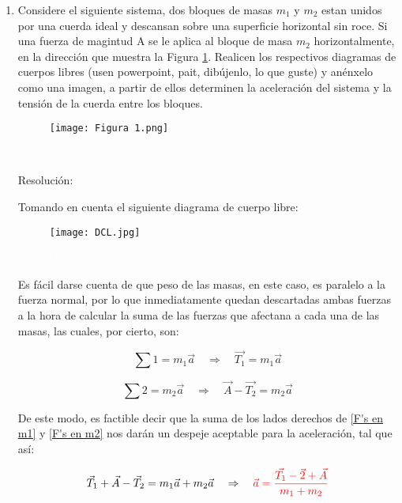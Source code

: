 \documentclass[12pt,letterpaper]{article}
\begin{document}
\begin{enumerate}
    \item Considere el siguiente sistema, dos bloques de masas $m_{1}$ y $m_{2}$ estan unidos por una cuerda ideal y descansan sobre una superficie horizontal sin roce. Si una fuerza de magintud A se le aplica al bloque de masa $m_{2}$ horizontalmente, en la dirección que muestra la Figura \ref{fig 1}. Realicen los respectivos diagramas de cuerpos libres (usen powerpoint, pait, dibújenlo, lo que guste) y anénxelo como una imagen, a partir de ellos determinen la aceleración del sistema y la tensión de la cuerda entre los bloques.

        \begin{figure}[h]
            \centering
            \texttt{[image: Figura 1.png]}
            \caption{\textcolor{white}{Sistema de dos bloques amarrados}}
            \label{fig 1}
        \end{figure}
    
    Resolución:\newline

    Tomando en cuenta el siguiente diagrama de cuerpo libre:

        \begin{figure}[h]
            \centering
            \texttt{[image: DCL.jpg]}
            \caption{\textcolor{white}{Diagrama cuerpo libre de dos bloques amarrados}}
            \label{Diagrama 1}
        \end{figure}

    Es fácil darse cuenta de que peso de las masas, en este caso, es paralelo a la fuerza normal, por lo que inmediatamente quedan descartadas ambas fuerzas a la hora de calcular la suma de las fuerzas que afectana a cada una de las masas, las cuales, por cierto, son:

        \begin{equation}
            \label{F's en m1}
            \sum 1=m_{1}\vec{a}\quad \Rightarrow \quad \vec{T_{1}}=m_{1}\vec{a}
        \end{equation}

        \begin{equation}
            \label{F's en m2}
            \sum 2=m_{2}\vec{a}\quad \Rightarrow \quad \vec{A}-\vec{T_{2}}=m_{2}\vec{a}
        \end{equation}

    De este modo, es factible decir que la suma de los lados derechos de \ref{F's en m1} y \ref{F's en m2} nos darán un despeje aceptable para la aceleración, tal que así:

        \begin{equation}
            \label{aceleración en sistema de cuerdas}
            \vec{T}_{1}+\vec{A}-\vec{T}_{2}=m_{1}\vec{a}+m_{2}\vec{a}\quad
            \Rightarrow \quad
            \textcolor{red}{\vec{a}=\frac{\vec{T_{1}}-\vec{2}+\vec{A}}{m_{1}+m_{2}}}
        \end{equation}
    

\end{enumerate}
\end{document}
